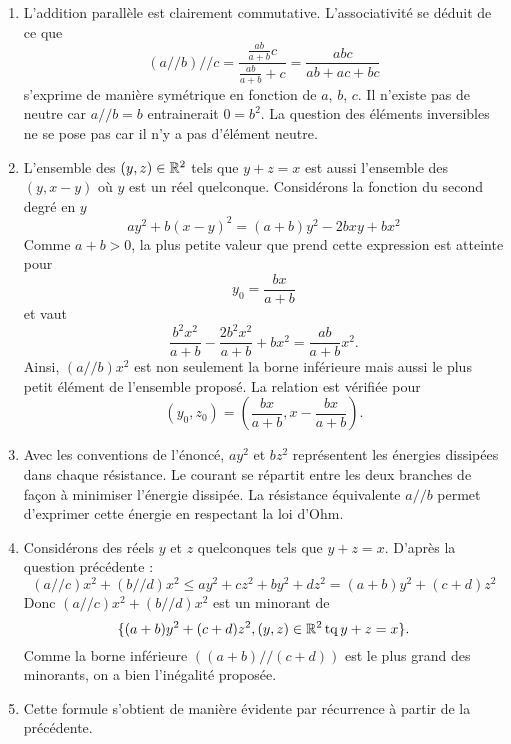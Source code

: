 \begin{enumerate}
\item L'addition parall{\`e}le est clairement commutative. L'associativit{\'e} se d{\'e}duit de ce que
\[(a//b)//c=\frac{\frac{ab}{a+b}c}{\frac{ab}{a+b}+c}=\frac{abc}{ab+ac+bc}\]
s'exprime de mani{\`e}re sym{\'e}trique en fonction de $a$, $b$, $c$.\newline 
Il n'existe pas de neutre car $a//b=b$ entrainerait $0=b^{2}$. La question des {\'e}l{\'e}ments inversibles ne se pose pas car il n'y a pas d'{\'e}l{\'e}ment neutre.

\item L'ensemble des $(y,z)\in \mathbb{R}^{2}$ tels que $y+z=x$ est aussi l'ensemble des $(y,x-y)$ o{\`u} $y$ est un r{\'e}el quelconque. \newline
Consid{\'e}rons la fonction du second degr{\'e} en $y$
$$ay^{2}+b(x-y)^{2}=(a+b)y^{2}-2bxy+bx^{2}$$
Comme $a+b>0$, la plus petite valeur que prend cette expression est atteinte pour $$y_0=\frac{bx}{a+b}$$ et vaut
\[\frac{b^{2}x^{2}}{a+b}-\frac{2b^{2}x^{2}}{a+b}+bx^{2}=\frac{ab}{a+b}x^{2}.\]
Ainsi, $(a//b)x^{2}$ est non seulement la borne inf{\'e}rieure mais aussi le plus petit {\'e}l{\'e}ment de l'ensemble propos{\'e}. La relation est v{\'e}rifi{\'e}e pour
\[(y_0,z_0)=(\frac{bx}{a+b},x-\frac{bx}{a+b}).\]

\item Avec les conventions de l'{\'e}nonc{\'e}, $ay^{2}$ et $bz^{2}$ repr{\'e}sentent les {\'e}nergies dissip{\'e}es dans chaque r{\'e}sistance. Le courant se r{\'e}partit entre les deux branches de fa\c{c}on {\`a} minimiser l'{\'e}nergie dissip{\'e}e. La r{\'e}sistance {\'e}quivalente $a//b$ permet d'exprimer cette {\'e}nergie en respectant la loi d'Ohm.

\item Consid{\'e}rons des r{\'e}els $y$ et $z$ quelconques tels que $y+z=x$. D'apr{\`e}s la question pr{\'e}c{\'e}dente :
\[(a//c)x^{2}+(b//d)x^{2}\leq ay^{2}+cz^{2}+by^{2}+dz^{2}=(a+b)y^{2}+(c+d)z^{2}\]
Donc $(a//c)x^{2}+(b//d)x^{2}$ est un minorant de
\[\{(a+b)y^{2}+(c+d)z^{2},(y,z)\in \mathbb{R}^{2}\,\mathrm{ tq }\,y+z=x\}.\]
Comme la borne inférieure $((a+b)//(c+d))$ est le plus grand des minorants, on a bien l'in{\'e}galit{\'e} propos{\'e}e.

\item Cette formule s'obtient de mani{\`e}re {\'e}vidente par r{\'e}currence {\`a} partir de la pr{\'e}c{\'e}dente.
\end{enumerate}
